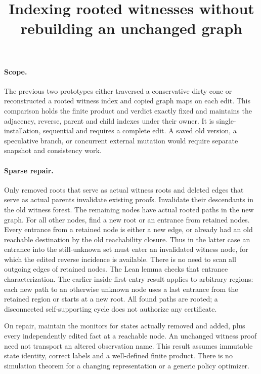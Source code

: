 \documentclass{article}
\title{Indexing rooted witnesses without rebuilding an unchanged graph}
\author{}\date{}
\begin{document}
\maketitle
\paragraph{Scope.}
The previous two prototypes either traversed a conservative dirty cone or
reconstructed a rooted witness index and copied graph maps on each edit.
This comparison holds the finite product and verdict exactly fixed and
maintains the adjacency, reverse, parent and child indexes under their
owner. It is single-installation, sequential and requires a complete edit.
A saved old version, a speculative branch, or concurrent external mutation
would require separate snapshot and consistency work.

\paragraph{Sparse repair.}
Only removed roots that serve as actual witness roots and deleted edges
that serve as actual parents invalidate existing proofs. Invalidate their
descendants in the old witness forest. The remaining nodes have actual
rooted paths in the new graph. For all other nodes, find a new root or
an entrance from retained nodes. Every entrance from a retained node
is either a new edge, or already had an old reachable destination by
the old reachability closure. Thus in the latter case an entrance into
the still-unknown set must enter an invalidated witness node, for which
the edited reverse incidence is available. There is no need to scan
all outgoing edges of retained nodes. The Lean lemma checks that
entrance characterization. The earlier inside-first-entry result applies
to arbitrary regions: each new path to an otherwise unknown node
uses a last entrance from the retained region or starts at a new root.
All found paths are rooted; a disconnected self-supporting cycle
does not authorize any certificate.

On repair, maintain the monitors for states actually removed and
added, plus every independently edited fact at a reachable node.
An unchanged witness proof need not transport an altered observation
name. This result assumes immutable state identity, correct labels and a
well-defined finite product. There is no simulation theorem for a
changing representation or a generic policy optimizer.
\end{document}
